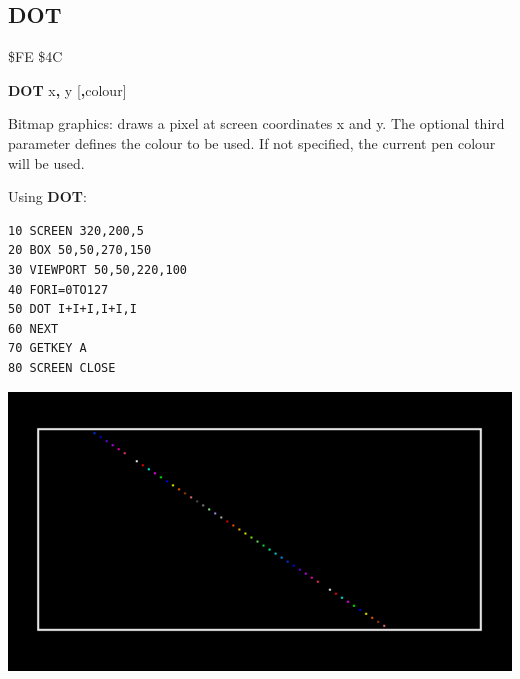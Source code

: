 
\newpage
\subsection{DOT}
\begin{description}[leftmargin=2cm,style=nextline]
\item [Token:] \$FE \$4C
\item [Format:] {\bf DOT} x{\bf,} y [{\bf,}colour]
\item [Usage:] Bitmap graphics: draws a pixel at screen coordinates x and y.
               The optional third parameter defines the colour
               to be used. If not specified, the current
               pen colour will be used.

\item [Example:] Using {\bf DOT}:
\begin{tcolorbox}[colback=black,coltext=white]
\verbatimfont{\codefont}
\begin{verbatim}
10 SCREEN 320,200,5
20 BOX 50,50,270,150
30 VIEWPORT 50,50,220,100
40 FORI=0TO127
50 DOT I+I+I,I+I,I
60 NEXT
70 GETKEY A
80 SCREEN CLOSE
\end{verbatim}
\end{tcolorbox}
\item \begin{center}\includegraphics[width=0.7\linewidth]{images/dot.png}\end{center}
\end{description}


\newpage
